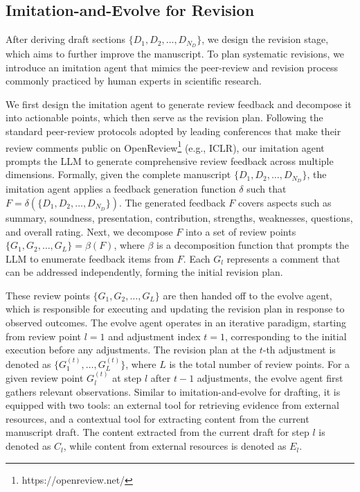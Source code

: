 \documentclass[manuscript,review,anonymous]{acmart}
\begin{document}
\subsection{Imitation-and-Evolve for Revision}

After deriving draft sections $\{D_1, D_2, \ldots, D_{N_D}\}$, we design the revision stage, which aims to further improve the manuscript. To plan systematic revisions, we introduce an imitation agent that mimics the peer-review and revision process commonly practiced by human experts in scientific research.

We first design the imitation agent to generate review feedback and decompose it into actionable points, which then serve as the revision plan. Following the standard peer-review protocols adopted by leading conferences that make their review comments public on OpenReview\footnote{https://openreview.net/} (e.g., ICLR), our imitation agent prompts the LLM to generate comprehensive review feedback across multiple dimensions. Formally, given the complete manuscript $\{D_1, D_2, \ldots, D_{N_D}\}$, the imitation agent applies a feedback generation function $\delta$ such that $F = \delta(\{D_1, D_2, \ldots, D_{N_D}\})$. The generated feedback $F$ covers aspects such as summary, soundness, presentation, contribution, strengths, weaknesses, questions, and overall rating. Next, we decompose $F$ into a set of review points $\{G_1, G_2, \ldots, G_L\} = \beta(F)$, where $\beta$ is a decomposition function that prompts the LLM to enumerate feedback items from $F$. Each $G_l$ represents a comment that can be addressed independently, forming the initial revision plan.

These review points $\{G_1, G_2, \ldots, G_L\}$ are then handed off to the evolve agent, which is responsible for executing and updating the revision plan in response to observed outcomes. The evolve agent operates in an iterative paradigm, starting from review point $l = 1$ and adjustment index $t = 1$, corresponding to the initial execution before any adjustments. The revision plan at the $t$-th adjustment is denoted as $\{G_1^{(t)}, \ldots, G_L^{(t)}\}$, where $L$ is the total number of review points. For a given review point $G_l^{(t)}$ at step $l$ after $t-1$ adjustments, the evolve agent first gathers relevant observations. Similar to imitation-and-evolve for drafting, it is equipped with two tools: an external tool for retrieving evidence from external resources, and a contextual tool for extracting content from the current manuscript draft. The content extracted from the current draft for step $l$ is denoted as $C_l$, while content from external resources is denoted as $E_l$.
\end{document}
